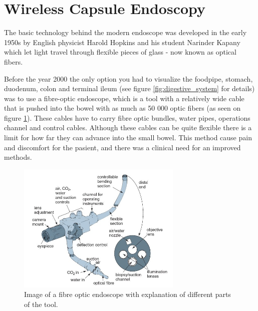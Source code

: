 \documentclass[english, a4paper]{report}
\begin{document}
\section{Wireless Capsule Endoscopy}
The basic technology behind the modern endoscope was developed in the early 1950s by English physicist Harold Hopkins and his student Narinder Kapany which let light travel through flexible pieces of glass - now known as optical fibers. \autocite{NewMethod54}

Before the year 2000 the only option you had to visualize the foodpipe, stomach, duodenum, colon and terminal ileum (see figure \ref{fig:digestive_system} for details) was to use a fibre-optic endoscope, which is a tool with a relatively wide cable that is pushed into the bowel with as much as 50 000 optic fibers (as seen on figure \ref{fig:fibre-optic-endoscopy}). These cables have to carry fibre optic bundles, water pipes, operations channel and control cables. Although these cables can be quite flexible there is a limit for how far they can advance into the small bowel. This method cause pain and discomfort for the pasient, and there was a clinical need for an improved methods.

\begin{figure}
  \begin{center}
    \includegraphics[width=0.7\textwidth]{fibre-optic-endoscopy}
    \caption{Image of a fibre optic endoscope with explanation of different parts of the tool. \autocite{MedicalPhysics}}
    \label{fig:fibre-optic-endoscopy}
  \end{center}
\end{figure}
\end{document}
